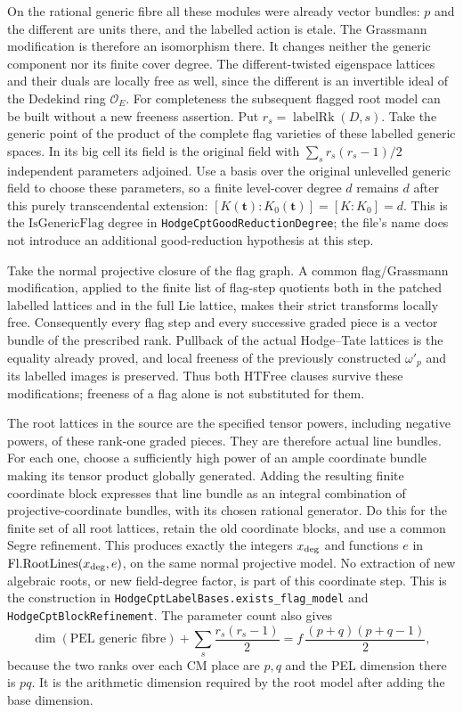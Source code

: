 On the rational generic fibre all these modules
were already vector bundles: \(p\) and the different
are units there, and the labelled action is etale.
The Grassmann modification is therefore an isomorphism
there. It changes neither the generic component nor
its finite cover degree.
The different-twisted eigenspace lattices and their
duals are locally free as well, since the different
is an invertible ideal of the Dedekind ring
\(\mathcal O_E\).
For completeness the subsequent flagged root model
can be built without a new freeness assertion.
Put \(r_s=\operatorname{labelRk}(D,s)\).
Take the generic point of the product of the complete
flag varieties of these labelled generic spaces.
In its big cell its field is the original field
with \(\sum_s r_s(r_s-1)/2\) independent parameters
adjoined. Use a basis over the original unlevelled
generic field to choose these parameters, so a finite
level-cover degree \(d\) remains \(d\) after this
purely transcendental extension:
\([K(\mathbf t):K_0(\mathbf t)]=[K:K_0]=d\).
This is the \(\mathrm{IsGenericFlag}\) degree in
\texttt{HodgeCptGoodReductionDegree}; the file's name
does not introduce an additional good-reduction
hypothesis at this step.

Take the normal projective closure of the flag graph.
A common flag/Grassmann modification, applied to the
finite list of flag-step quotients both in the
patched labelled lattices and in the full Lie
lattice, makes their strict transforms locally free.
Consequently every flag step and every successive
graded piece is a vector bundle of the prescribed
rank. Pullback of the actual Hodge--Tate lattices is
the equality already proved, and local freeness
of the previously constructed \(\omega'_p\) and
its labelled images is preserved.
Thus both \(\mathrm{HTFree}\) clauses survive these
modifications; freeness of a flag alone is not
substituted for them.

The root lattices in the source are the specified
tensor powers, including negative powers, of these
rank-one graded pieces.
They are therefore actual line bundles.
For each one, choose a sufficiently high power of
an ample coordinate bundle making its tensor
product globally generated.
Adding the resulting finite coordinate block
expresses that line bundle as an integral
combination of projective-coordinate bundles,
with its chosen rational generator.
Do this for the finite set of all root lattices,
retain the old coordinate blocks, and use a common
Segre refinement.
This produces exactly the integers \(x_{\rm deg}\)
and functions \(e\) in
\(\mathrm{Fl.RootLines}(x_{\rm deg},e)\), on the
same normal projective model.
No extraction of new algebraic roots, or new
field-degree factor, is part of this coordinate
step.
This is the construction in
\texttt{HodgeCptLabelBases.exists\_flag\_model}
and \texttt{HodgeCptBlockRefinement}.
The parameter count also gives
\[
 \dim(\text{PEL generic fibre})
   +\sum_s\frac{r_s(r_s-1)}2
       =f\,\frac{(p+q)(p+q-1)}2,
\]
because the two ranks over each CM place are \(p,q\)
and the PEL dimension there is \(pq\).
It is the arithmetic dimension required by the
root model after adding the base dimension.


